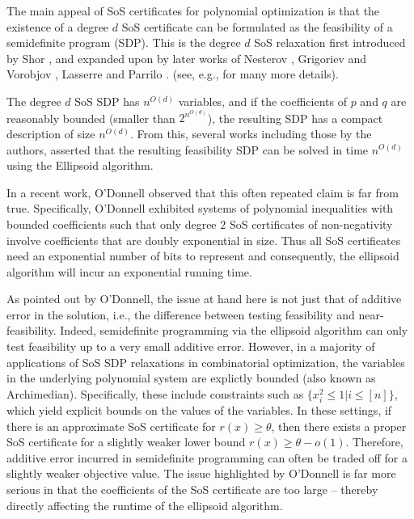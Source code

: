 The main appeal of SoS certificates for polynomial optimization is that the existence of a degree $d$ SoS certificate can be formulated as the feasibility of a semidefinite program (SDP).
%
This is the degree $d$ SoS relaxation first introduced by Shor \cite{shor1987class}, and expanded upon by later works of Nesterov \cite{nesterov2000squared}, Grigoriev and Vorobjov \cite{grigoriev2001complexity}, Lasserre \cite{lasserre2000optimisation,lasserre2001global}  and Parrilo \cite{parrilo2000structured}.
(see, e.g., \cite{laurent2009sums,barak2014sum} for many more details).


The degree $d$ SoS SDP has $n^{O(d)}$ variables, and if the coefficients of $p$ and $q$ are reasonably bounded (smaller than $2^{n^{O(d)}}$), the resulting SDP has a compact description of size $n^{O(d)}$.
%
From this, several works including those by the authors, asserted that the resulting feasibility SDP can be solved in time $n^{O(d)}$ using the Ellipsoid algorithm.

In a recent work, O'Donnell \cite{odonnell17} observed that this often repeated claim is far from true.
%
Specifically, O'Donnell exhibited systems of polynomial inequalities with bounded coefficients such that only degree $2$ SoS certificates of non-negativity involve coefficients that are doubly exponential in size.
%
Thus all SoS certificates need an exponential number of bits to represent and consequently, the ellipsoid algorithm will incur an exponential running time.
%
 
As pointed out by O'Donnell, the issue at hand here is not just that of additive error in the solution, i.e., the difference between testing feasibility and near-feasibility.  
%
Indeed, semidefinite programming via the ellipsoid algorithm can only test feasibility up to a very small additive error.
%
However, in a majority of applications of SoS SDP relaxations in combinatorial optimization, the variables in the underlying polynomial system are explictly bounded (also known as Archimedian).
%
Specifically, these include constraints such as $\{ x_i^2 \leq 1 | i \leq [n]\}$, which yield explicit bounds on the values of the variables.
%
In these settings, if there is an approximate SoS certificate for $r(x) \geq \theta$, then there exists a proper SoS certificate for a slightly weaker lower bound $r(x) \geq \theta - o(1)$.
%
Therefore, additive error incurred in semidefinite programming can often be traded off for a slightly weaker objective value.
%
The issue highlighted by O'Donnell is far more serious in that the coefficients of the SoS certificate are too large -- thereby directly affecting the runtime of the ellipsoid algorithm.

